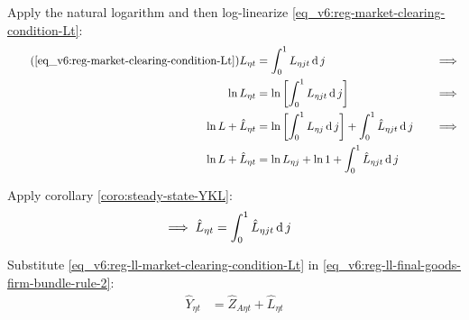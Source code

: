\documentclass[../thesis.tex]{subfiles}
\begin{document}
Apply the natural logarithm and then log-linearize \ref{eq_v6:reg-market-clearing-condition-Lt}:
\begin{alignat}{2}
	\tag{\ref{eq_v6:reg-market-clearing-condition-Lt}}
	L_{\eta t} &= \int_{0}^{1} L_{\eta jt} \dif j &\implies \\
	\ln L_{\eta t} &= \ln \left[ \int_{0}^{1} L_{\eta jt} \dif j \right] &\implies \nonumber \\
	\ln L + \hat{L}_{\eta t} &= \ln \left[ \int_{0}^{1} L_{\eta j} \dif j \right] + \int_{0}^{1} \hat{L}_{\eta jt} \dif j \quad &\implies \nonumber \\
	\ln L + \hat{L}_{\eta t} &= \ln L_{\eta j} + \ln 1 + \int_{0}^{1} \hat{L}_{\eta jt} \dif j \nonumber
\end{alignat}

Apply corollary \ref{coro:steady-state-YKL}:
\begin{align}
	\implies \hat{L}_{\eta t} &= \int_{0}^{1} \hat{L}_{\eta jt} \operatorname{d} j \label{eq_v6:reg-ll-market-clearing-condition-Lt}
\end{align}

\begin{comment}
	By analogy, the total capital deviation is the sum of all firm's deviations:
	\begin{align}
		\hat{K}_{\eta t} = \int_{0}^{1} \hat{K}_{\eta jt} \dif j \label{eq_v6:reg-ll-capital-clearing-condition}
	\end{align}
\end{comment}


Substitute \ref{eq_v6:reg-ll-market-clearing-condition-Lt} in \ref{eq_v6:reg-ll-final-goods-firm-bundle-rule-2}: %
\begin{align}
	\hat{Y}_{\eta t} &= \hat{Z}_{A\eta t} + \hat{L}_{\eta t} \label{eq_v6:reg-ll-final-goods-firm-bundle-rule-3}
\end{align}

\end{document}
